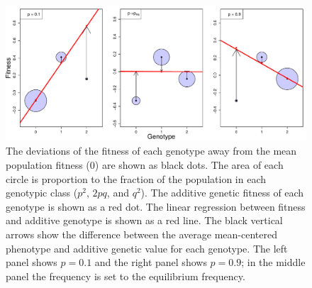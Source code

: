 \begin{figure}
\begin{center}
  \includegraphics[width = \textwidth]{figures/additive_effect_OverDom.pdf}
\end{center}
\caption{The deviations of the fitness of each genotype away from the mean population
  fitness (0) are shown as black dots. The area of each circle is proportion to the fraction of
the population in each genotypic class ($p^2$, $2pq$, and $q^2$). The
additive genetic fitness of each genotype is shown as
 a red dot. The linear regression between fitness and additive
 genotype is shown as a red line. The black vertical arrows show the
 difference between the average mean-centered phenotype and additive genetic value for each genotype.
The left panel shows $p=0.1$ and the right panel shows $p=0.9$; in the
middle panel the frequency is set to the equilibrium frequency.  } \label{fig:additive_effect_OverDom}
\end{figure}



